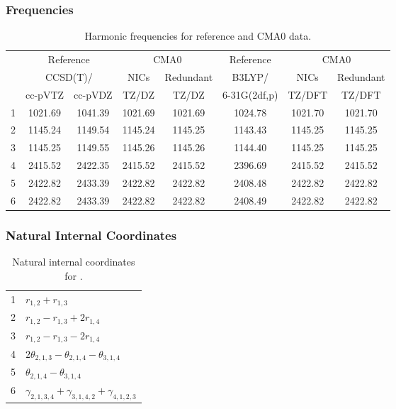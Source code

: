 \documentclass[10pt,oneside]{article}
\begin{document}
\begin{table}[h!]
\subsubsection*{Frequencies}
\centering
\caption{Harmonic frequencies for reference and CMA0 data.}
\begin{tabular}{cccccccc}
\toprule
{} & \multicolumn{2}{c}{Reference} & \multicolumn{2}{c}{CMA0} &    Reference & \multicolumn{2}{c}{CMA0} \\
{} & \multicolumn{2}{c}{CCSD(T)/} &    NICs &  Redundant &       B3LYP/ &    NICs & Redundant \\
{} &   cc-pVTZ & cc-pVDZ &   TZ/DZ &      TZ/DZ & 6-31G(2df,p) &  TZ/DFT &    TZ/DFT \\
\midrule
1 &   1021.69 & 1041.39 & 1021.69 &    1021.69 &      1024.78 & 1021.70 &   1021.70 \\
2 &   1145.24 & 1149.54 & 1145.24 &    1145.25 &      1143.43 & 1145.25 &   1145.25 \\
3 &   1145.25 & 1149.55 & 1145.26 &    1145.26 &      1144.40 & 1145.25 &   1145.25 \\
4 &   2415.52 & 2422.35 & 2415.52 &    2415.52 &      2396.69 & 2415.52 &   2415.52 \\
5 &   2422.82 & 2433.39 & 2422.82 &    2422.82 &      2408.48 & 2422.82 &   2422.82 \\
6 &   2422.82 & 2433.39 & 2422.82 &    2422.82 &      2408.49 & 2422.82 &   2422.82 \\
\bottomrule
\end{tabular}
\end{table}

\begin{table}[h!]
\subsubsection*{Natural Internal Coordinates}
\centering
\caption{Natural internal coordinates for .}
\small
\begin{tabular}{ll}
\toprule
  1   & $r_{1,2} + r_{1,3}$ \\
  2   & $r_{1,2} - r_{1,3} + 2r_{1,4}$ \\
  3   & $r_{1,2} - r_{1,3} - 2r_{1,4}$ \\
  4   & $2\theta_{2,1,3} - \theta_{2,1,4} - \theta_{3,1,4}$ \\
  5   & $\theta_{2,1,4} - \theta_{3,1,4}$ \\
  6   & $\gamma_{2,1,3,4} + \gamma_{3,1,4,2} + \gamma_{4,1,2,3}$ \\
\bottomrule
\end{tabular}
\end{table}
\end{document}
